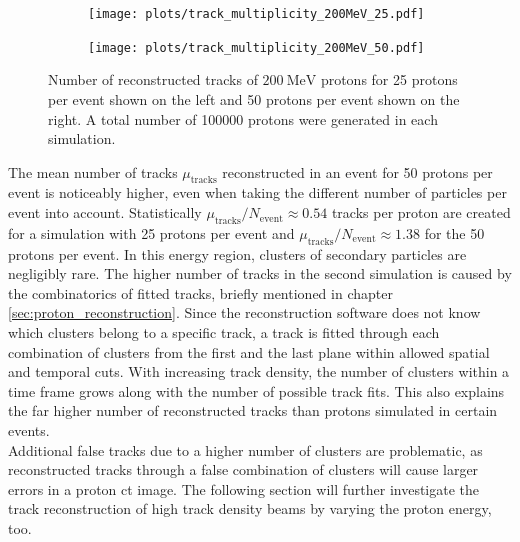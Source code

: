 \begin{figure}
  \hspace{-0.4cm}
  \begin{subfigure}{0.51\textwidth}
      \centering
      \texttt{[image: plots/track\_multiplicity\_200MeV\_25.pdf]}
  \end{subfigure}
  \begin{subfigure}{0.51\textwidth}
      \hspace{-0.13cm}
      \texttt{[image: plots/track\_multiplicity\_200MeV\_50.pdf]}
  \end{subfigure}
  \caption{Number of reconstructed tracks of $\SI{200}{\mega\eV}$ protons for 25 protons per event shown on the left and
  50 protons per event shown on the right. A total number of 100000 protons were generated in each simulation.}
  \label{fig:multiplicity}
\end{figure}

The mean number of tracks $\mu_{\text{tracks}}$ reconstructed in an event
for 50 protons per event is noticeably higher, even when taking the different number of particles per event into account. Statistically
$\mu_{\text{tracks}}/ N_{\text{event}} \approx 0.54$ tracks per proton are created for a simulation with 25 protons per event and
$\mu_{\text{tracks}}/ N_{\text{event}}\approx 1.38$ for
the 50 protons per event. In this energy region, clusters of secondary particles are negligibly rare. The higher number of tracks in the second simulation is caused by
the combinatorics of fitted tracks, briefly mentioned in chapter \ref{sec:proton_reconstruction}.
Since the reconstruction software does not know which clusters belong to a specific track, a track
is fitted through each combination of clusters from the first and the last plane within allowed spatial and temporal cuts.
With increasing track density, the number
of clusters within a time frame grows along with the number of possible track fits.
This also explains the far higher number of reconstructed tracks than protons simulated in certain events. \\
Additional false tracks due to a higher number of clusters are problematic, as reconstructed tracks through a false
combination of clusters will cause larger errors in a proton ct image. The following section will further investigate the track reconstruction of high
track density beams by varying the proton energy, too.


